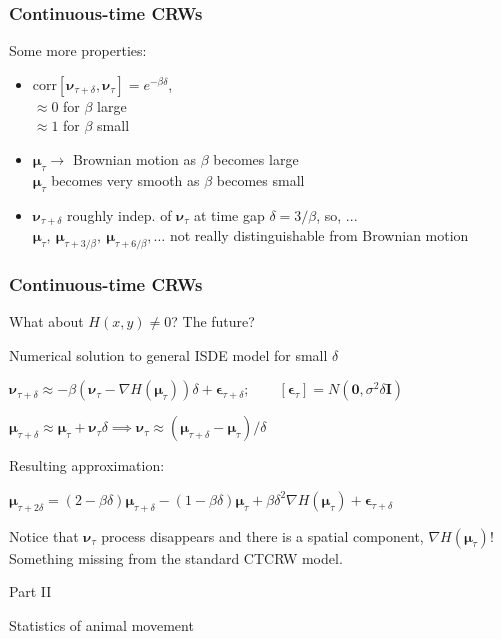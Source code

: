 \documentclass[36pt,handout]{beamer}
\newcommand{\ft}[1]{\frametitle{#1}}
\newcommand{\nt}[1]{\textcolor{noaaturq}{#1}}
\newcommand{\bigsep}{\itemsep=1.5\baselineskip}
\newcommand{\bmu}{\boldsymbol{\mu}}
\newcommand{\be}{\boldsymbol{\epsilon}}
\newcommand{\bv}{\boldsymbol{\nu}}
\begin{document}
\begin{frame}
\ft{Continuous-time CRWs}
Some more properties: 
\medskip

\begin{itemize}
\bigsep
\item $\mbox{corr}[\bv_{\tau+\delta},\bv_\tau] = e^{-\beta\delta}$,\\
$\approx 0$ for $\beta$ large\\
$\approx 1$ for $\beta$ small
\item $\bmu_\tau \to$ Brownian motion as $\beta$ becomes large\\
$\bmu_\tau$ becomes very smooth as $\beta$ becomes small
\item $\bv_{\tau+\delta}$ roughly indep. of $\bv_\tau$ at time gap $\delta = 3/\beta$, so, ...\medskip \\
$\bmu_\tau,\ \bmu_{\tau+3/\beta},\ \bmu_{\tau+6/\beta},\dots$ not really distinguishable from Brownian motion
\end{itemize}
\vfill
\end{frame}


\begin{frame}
\ft{Continuous-time CRWs}
What about $H(x,y) \ne 0$? The future?
\medskip

\begin{block}{Numerical solution to general ISDE model}
for small $\delta$

$\bv_{\tau+\delta} \approx -\beta(\bv_\tau - \nabla H(\bmu_\tau) )\delta + \be_{\tau+\delta};\qquad [\be_{\tau}]=N(\mathbf{0},\sigma^2\delta\mathbf{I})$
\medskip

$\bmu_{\tau+\delta} \approx \bmu_\tau + \bv_\tau \delta \implies \bv_\tau \approx (\bmu_{\tau+\delta}-\bmu_\tau)/\delta$
\bigskip

Resulting approximation:

$
\bmu_{\tau+2\delta} = (2-\beta\delta)\bmu_{\tau+\delta} -  (1-\beta\delta)\bmu_\tau + \beta\delta^2 \nabla H(\bmu_\tau) + \be_{\tau+\delta}
$
\end{block}
\medskip

Notice that $\bv_\tau$ process disappears and there is a spatial component, $\nabla H(\bmu_\tau)$! Something missing from the standard CTCRW model.


\end{frame}




{
\renewcommand{\baselinestretch}{2}\normalsize

\begin{frame}
\nt{\Huge Part II}
\bigskip

\nt{\Huge Statistics of animal movement}
\end{frame}
}
\end{document}
